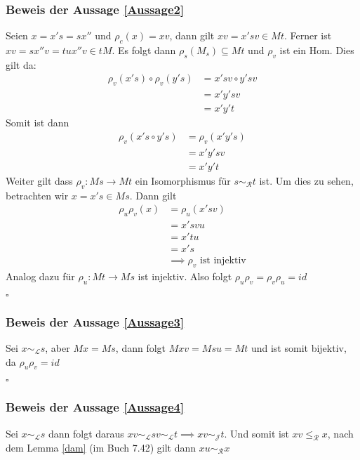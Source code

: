 \documentclass[12pt, german]{article}
\newcommand{\grel}{\sim_{\mathcal{L}}}
\newcommand{\grer}{\sim_{\mathcal{R}}}
\newcommand{\grej}{\sim_{\mathcal{J}}}
\newcommand{\lgrereq}{\leqslant_{\mathcal{R}}}
\newcommand{\bewiesen}{
	
	\begin{flushright}
		$\square$  \\
\end{flushright}}
\begin{document}
	\subsubsection{Beweis der Aussage \ref{Aussage2}}
	Seien $x = x's = sx''$ und $\rho_c(x) = xv$, dann gilt $xv = x'sv \in Mt$. Ferner ist $xv = sx''v = tux''v \in tM$. 
	Es folgt dann $\rho_s(M_s) \subseteq Mt$ und $\rho_v$ ist ein Hom. Dies gilt da:  
	\begin{align*}
		\rho_v(x's)\circ \rho_v(y's) &= x'sv \circ y'sv \\ 
		&= x'y'sv \\
		&= x'y't
	\end{align*}
	Somit ist dann 
	\begin{align*}
		\rho_v(x's \circ y's) &= \rho_v(x'y's) \\
		&= x'y'sv \\
		&= x'y't
	\end{align*}
	Weiter gilt dass $\rho_v: Ms \to Mt$ ein Isomorphismus für $s \grer t$ ist. Um dies zu sehen, betrachten wir $x = x's \in Ms$. Dann gilt 
	\begin{align*}
		\rho_u\rho_v(x) &= \rho_u(x'sv) \\
		&= x'svu \\
		&= x'tu \\
		&=x's \\
		&\implies \rho_v \text{ ist injektiv}
	\end{align*}
	Analog dazu für $\rho_u: Mt \to Ms$ ist injektiv. Also folgt $\rho_u\rho_v = \rho_v\rho_u = id$
	\bewiesen
	
	\subsubsection{Beweis der Aussage \ref{Aussage3}}
	Sei $x \grel s$, aber $Mx = Ms$, dann folgt $Mxv = Msu = Mt$ und ist somit bijektiv, da $\rho_u\rho_v = id$
	\bewiesen
	
	\subsubsection{Beweis der Aussage \ref{Aussage4}}
	Sei $x\grel s$ dann folgt daraus $ xv \grel sv \grel t \implies xv \grej t$. Und somit ist $xv \lgrereq x$, nach dem Lemma \ref{dam} (im Buch 7.42) gilt dann $xu \grer x$ 
	
	
\end{document}
